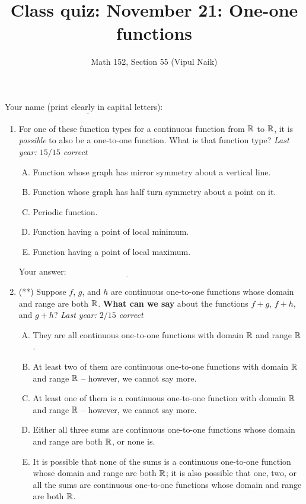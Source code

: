 \documentclass[10pt]{amsart}
\title{Class quiz: November 21: One-one functions}
\author{Math 152, Section 55 (Vipul Naik)}
\begin{document}
\maketitle

Your name (print clearly in capital letters): $\underline{\qquad\qquad\qquad\qquad\qquad\qquad\qquad\qquad\qquad\qquad}$

\begin{enumerate}
\item For one of these function types for a continuous function from
  $\mathbb{R}$ to $\mathbb{R}$, it is {\em possible} to also be a one-to-one
  function. What is that function type? {\em Last year: $15/15$
    correct}

  \begin{enumerate}[(A)]
  \item Function whose graph has mirror symmetry about a vertical line.
  \item Function whose graph has half turn symmetry about a point on it.
  \item Periodic function.
  \item Function having a point of local minimum.
  \item Function having a point of local maximum.
  \end{enumerate}

  \vspace{0.1in}
  Your answer: $\underline{\qquad\qquad\qquad\qquad\qquad\qquad\qquad}$
  \vspace{0.6in}

\item (**) Suppose $f$, $g$, and $h$ are continuous one-to-one
  functions whose domain and range are both $\mathbb{R}$. {\bf What can we
    say} about the functions $f + g$, $f + h$, and $g + h$? {\em Last
    year: $2/15$ correct}

  \begin{enumerate}[(A)]
  \item They are all continuous one-to-one functions with domain $\mathbb{R}$
    and range $\mathbb{R}$.
  \item At least two of them are continuous one-to-one functions with
    domain $\mathbb{R}$ and range $\mathbb{R}$ -- however, we cannot say more.
  \item At least one of them is a continuous one-to-one function with
    domain $\mathbb{R}$ and range $\mathbb{R}$ -- however, we cannot say more.
  \item Either all three sums are continuous one-to-one functions
    whose domain and range are both $\mathbb{R}$, or none is.
  \item It is possible that none of the sums is a continuous
    one-to-one function whose domain and range are both $\mathbb{R}$; it is
    also possible that one, two, or all the sums are continuous
    one-to-one functions whose domain and range are both $\mathbb{R}$.
  \end{enumerate}


\end{enumerate}
\end{document}

